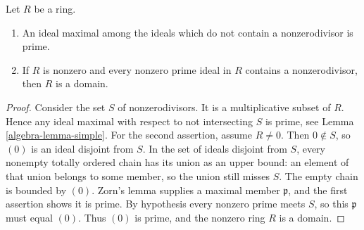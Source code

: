 \begin{lemma}
\label{editorial-source-lemma-characterize-domain}
Let $R$ be a ring.
\begin{enumerate}
\item An ideal maximal among the ideals which do not contain a
nonzerodivisor is prime.
\item If $R$ is nonzero and every nonzero prime ideal in $R$
contains a nonzerodivisor, then $R$ is a domain.
\end{enumerate}
\end{lemma}

\begin{proof}
Consider the set $S$ of nonzerodivisors. It is a multiplicative
subset of $R$. Hence any ideal maximal with respect to not intersecting
$S$ is prime, see
Lemma \ref{algebra-lemma-simple}.
For the second assertion, assume $R\ne0$. Then $0\notin S$,
so $(0)$ is an ideal disjoint from $S$. In the set of ideals disjoint
from $S$, every nonempty totally ordered chain has its union as an
upper bound: an element of that union belongs to some member, so
the union still misses $S$. The empty chain is bounded by $(0)$.
Zorn's lemma supplies a maximal member $\mathfrak p$, and the first
assertion shows it is prime. By hypothesis every nonzero prime
meets $S$, so this $\mathfrak p$ must equal $(0)$.
Thus $(0)$ is prime, and the nonzero ring $R$ is a domain.
\end{proof}